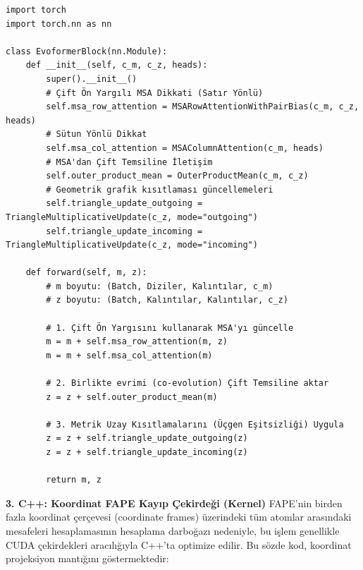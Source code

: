 \documentclass[11pt,a4paper]{article}
\begin{document}
\begin{Verbatim}[breaklines=true,breakanywhere=true,fontsize=\small]
import torch
import torch.nn as nn

class EvoformerBlock(nn.Module):
    def __init__(self, c_m, c_z, heads):
        super().__init__()
        # Çift Ön Yargılı MSA Dikkati (Satır Yönlü)
        self.msa_row_attention = MSARowAttentionWithPairBias(c_m, c_z, heads)
        # Sütun Yönlü Dikkat
        self.msa_col_attention = MSAColumnAttention(c_m, heads)
        # MSA'dan Çift Temsiline İletişim
        self.outer_product_mean = OuterProductMean(c_m, c_z)
        # Geometrik grafik kısıtlaması güncellemeleri
        self.triangle_update_outgoing = TriangleMultiplicativeUpdate(c_z, mode="outgoing")
        self.triangle_update_incoming = TriangleMultiplicativeUpdate(c_z, mode="incoming")
        
    def forward(self, m, z):
        # m boyutu: (Batch, Diziler, Kalıntılar, c_m)
        # z boyutu: (Batch, Kalıntılar, Kalıntılar, c_z)
        
        # 1. Çift Ön Yargısını kullanarak MSA'yı güncelle
        m = m + self.msa_row_attention(m, z)
        m = m + self.msa_col_attention(m)
        
        # 2. Birlikte evrimi (co-evolution) Çift Temsiline aktar
        z = z + self.outer_product_mean(m)
        
        # 3. Metrik Uzay Kısıtlamalarını (Üçgen Eşitsizliği) Uygula
        z = z + self.triangle_update_outgoing(z)
        z = z + self.triangle_update_incoming(z)
        
        return m, z
\end{Verbatim}
\textbf{3. C++: Koordinat FAPE Kayıp Çekirdeği (Kernel)} FAPE'nin birden fazla koordinat çerçevesi (coordinate frames) üzerindeki tüm atomlar arasındaki mesafeleri hesaplamasının hesaplama darboğazı nedeniyle, bu işlem genellikle CUDA çekirdekleri aracılığıyla C++'ta optimize edilir. Bu sözde kod, koordinat projeksiyon mantığını göstermektedir:
\end{document}
